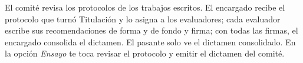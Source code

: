 \documentclass[11pt,a4paper]{article}
\begin{document}
{\small\tableofcontents}
\newpage
\begin{quevasahacer}
El comité revisa los protocolos de los trabajos escritos. El encargado recibe el protocolo que turnó Titulación y lo asigna a los evaluadores; cada evaluador escribe sus recomendaciones de forma y de fondo y firma; con todas las firmas, el encargado consolida el dictamen. El pasante solo ve el dictamen consolidado. En la opción \emph{Ensayo} te toca revisar el protocolo y emitir el dictamen del comité.
\end{quevasahacer}



\end{document}
